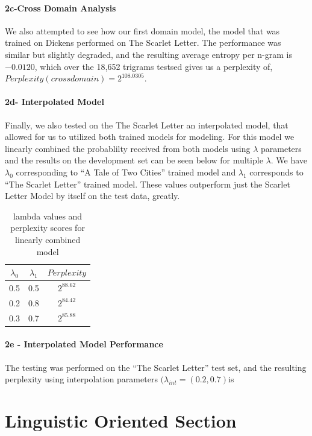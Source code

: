 \documentclass[paper=a4, fontsize=11pt]{scrartcl} %
\begin{document}
\paragraph{2c-Cross Domain Analysis}
We also attempted to see how our first domain model, the model that was trained on Dickens performed on The Scarlet Letter.  The performance was similar but slightly degraded, and the resulting average entropy per n-gram is $-0.0120$, which over the 18,652 trigrams testsed gives us  a perplexity of, $Perplexity(crossdomain) = 2^{108.0305}$.

\paragraph{2d- Interpolated Model}
Finally, we also tested on the The Scarlet Letter an interpolated model, that allowed for us to utilized both trained models for modeling.  For this model we linearly combined the probablilty received from both models using $\lambda$ parameters and the results on the development set can be seen below for multiple $\lambda$.  We have $\lambda_0$ corresponding to ``A Tale of Two Cities'' trained model and $\lambda_1$ corresponds to ``The Scarlet Letter'' trained model.  
These values outperform just the Scarlet Letter Model by itself on the test data, greatly.

\begin{table}
\centering
\label{tab:table2}
\caption{lambda values and perplexity scores for linearly combined model}
\begin{tabular}{|c|c|c|}
\hline
$\lambda_0$ & $\lambda_1$ & $Perplexity$ \\ \hline \hline
0.5 & 0.5 & $2^{88.62}$ \\ \hline
0.2 & 0.8 & $2^{84.42}$ \\ \hline
0.3 & 0.7 & $2^{85.88}$ \\ \hline
\end{tabular}
\end{table}

\paragraph{2e - Interpolated Model Performance}
The testing was performed on the ``The Scarlet Letter'' test set, and the resulting perplexity using interpolation parameters $(\lambda_{int} = (0.2,0.7)$is 

\section{Linguistic Oriented Section}
\end{document}
